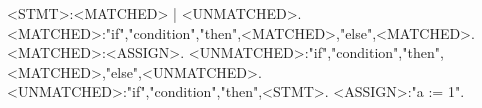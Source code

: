 <STMT>:<MATCHED> | <UNMATCHED>.
<MATCHED>:"if","condition","then",<MATCHED>,"else",<MATCHED>.
<MATCHED>:<ASSIGN>.
<UNMATCHED>:"if","condition","then",<MATCHED>,"else",<UNMATCHED>.
<UNMATCHED>:"if","condition","then",<STMT>.
<ASSIGN>:"a := 1".